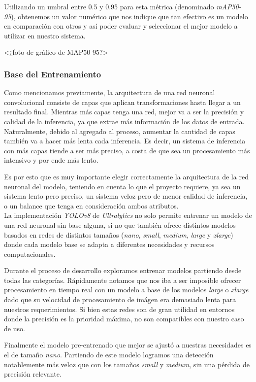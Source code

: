 \documentclass[a4paper]{article}
\begin{document}
Utilizando un umbral entre 0.5 y 0.95 para esta métrica (denominado \textit{mAP50-95}), obtenemos un valor numérico que nos indique que tan efectivo es un modelo en comparación con otros y así poder evaluar y seleccionar el mejor modelo a utilizar en nuestro sistema.

<¿foto de gráfico de MAP50-95?>

\subsubsection{Base del Entrenamiento}

Como mencionamos previamente, la arquitectura de una red neuronal convolucional consiste de capas que aplican transformaciones hasta llegar a un resultado final. Mientras más capas tenga una red, mejor va a ser la precisión y calidad de la inferencia, ya que extrae más información de los datos de entrada. Naturalmente, debido al agregado al proceso, aumentar la cantidad de capas también va a hacer más lenta cada inferencia. Es decir, un sistema de inferencia con más capas tiende a ser más preciso, a costa de que sea un procesamiento más intensivo y por ende más lento.

Es por esto que es muy importante elegir correctamente la arquitectura de la red neuronal del modelo, teniendo en cuenta lo que el proyecto requiere, ya sea un sistema lento pero preciso, un sistema veloz pero de menor calidad de inferencia, o un balance que tenga en consideración ambos atributos. \\

La implementación \textit{YOLOv8} de \textit{Ultralytics} no solo permite entrenar un modelo de una red neuronal sin base alguna, si no que también ofrece distintos modelos basados en redes de distintos tamaños (\textit{nano}, \textit{small}, \textit{medium}, \textit{large} y \textit{xlarge}) donde cada modelo base se adapta a diferentes necesidades y recursos computacionales.

Durante el proceso de desarrollo exploramos entrenar modelos partiendo desde todas las categorías. Rápidamente notamos que nos iba a ser imposible ofrecer procesamiento en tiempo real con un modelo a base de los modelos \textit{large} o \textit{xlarge} dado que su velocidad de procesamiento de imágen era demasiado lenta para nuestros requerimientos. Si bien estas redes son de gran utilidad en entornos donde la precisión es la prioridad máxima, no son compatibles con nuestro caso de uso.

Finalmente el modelo pre-entrenado que mejor se ajustó a nuestras necesidades es el de tamaño \textit{nano}. Partiendo de este modelo logramos una detección notablemente más veloz que con los tamaños \textit{small} y \textit{medium}, sin una pérdida de precisión relevante.
\end{document}
